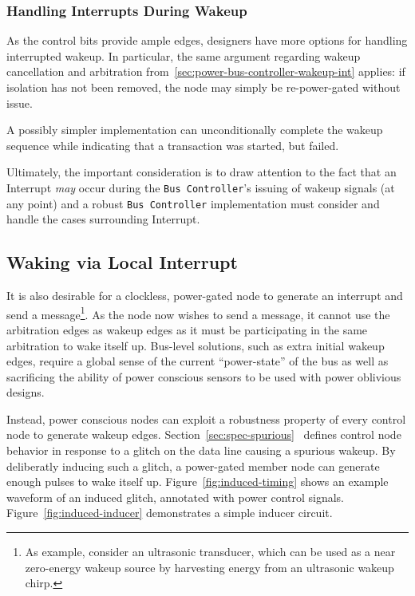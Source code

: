 \subsubsection{Handling Interrupts During Wakeup}
As the control bits provide ample edges, designers have more options for
handling interrupted wakeup. In particular, the same argument regarding wakeup
cancellation and arbitration from~\ref{sec:power-bus-controller-wakeup-int}
applies: if isolation has not been removed, the node may simply be
re-power-gated without issue.

A possibly simpler implementation can unconditionally complete the wakeup
sequence while indicating that a transaction was started, but failed.

Ultimately, the important consideration is to draw attention to the fact that
an Interrupt {\em may} occur during the {\tt Bus~Controller}'s issuing of
wakeup signals (at any point) and a robust {\tt Bus~Controller} implementation
must consider and handle the cases surrounding Interrupt.

\subsection{Waking via Local Interrupt}
It is also desirable for a clockless, power-gated \bus node to generate an
interrupt and send a message\footnote{
  As example, consider an ultrasonic transducer, which can be used as a near
  zero-energy wakeup source by harvesting energy from an ultrasonic wakeup
  chirp.}.
As the node now wishes to send a message, it cannot use the arbitration edges
as wakeup edges as it must be participating in the same arbitration to wake
itself up. Bus-level solutions, such as extra initial wakeup edges, require a
global sense of the current ``power-state'' of the bus as well as sacrificing
the ability of power conscious sensors to be used with power oblivious
designs.

Instead, power conscious nodes can exploit a robustness property of every \bus
control node to generate wakeup edges.
Section~\ref{sec:spec-spurious}~ defines control
node behavior in response to a glitch on the data line causing a spurious
wakeup. By deliberatly inducing such a glitch, a power-gated member node can
generate enough pulses to wake itself up. Figure~\ref{fig:induced-timing}
shows an example waveform of an induced glitch, annotated with power control
signals. Figure~\ref{fig:induced-inducer} demonstrates a simple inducer
circuit.

